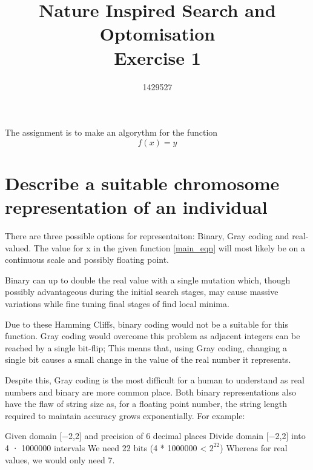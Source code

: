 
\def\W#1#2{$#1{#2}$ &\tt\string#1\string{#2\string}}
\def\X#1{$#1$ &\tt\string#1}
\def\Y#1{$\big#1$ &\tt\string#1}
\def\Z#1{\tt\string#1}
 


\title{%
  Nature Inspired Search and Optomisation  \\
  \large Exercise 1 \\
    }

\author{1429527}

\maketitle

The assignment is to make an algorythm for the function 
\begin{equation} \label{main_eqn}
f(x)=y
\end{equation}


\section{Describe a suitable chromosome representation of an individual}

There are three possible options for representaiton: Binary, Gray coding and real-valued. The value for x in the given function \ref{main_eqn} will most likely be on a continuous scale and possibly floating point.  %

Binary can up to double the real value with a single mutation which, though possibly advantageous during the initial search stages, may cause massive variations while fine tuning final stages of find local minima.

Due to these Hamming Cliffs, binary coding would not be a suitable for this function. Gray coding would overcome this problem as adjacent integers can be reached by a single bit-flip; This means that, using Gray coding, changing a single bit causes a small change in the value of the real number it represents.

Despite this, Gray coding is the most difficult for a human to understand as real numbers and binary are more common place. Both binary representations also have the flaw of string size as, for a floating point number, the string length required to maintain accuracy grows exponentially. For example:

Given domain [−2,2] and precision of 6 decimal places
 Divide domain [−2,2] into 4 · 1000000 intervals
 We need 22 bits (4 * 1000000 < $2^{22}$) 
Whereas for real values, we would only need 7.

